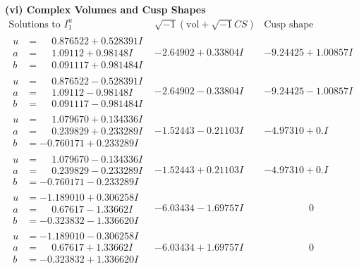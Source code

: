\documentclass[1p]{elsarticle_modified}
\theoremstyle{definition}
\newcommand{\I}{\sqrt{-1}}
\begin{document}
\newpage\flushleft \textbf{(vi) Complex Volumes and Cusp Shapes}
$$\begin{array}{c|c|c}  
\text{Solutions to }I^u_{1}& \I (\text{vol} + \sqrt{-1}CS) & \text{Cusp shape}\\
 \hline 
\begin{aligned}
u &= \phantom{-}0.876522 + 0.528391 I \\
a &= \phantom{-}1.09112 + 0.98148 I \\
b &= \phantom{-}0.091117 + 0.981484 I\end{aligned}
 & -2.64902 + 0.33804 I & -9.24425 + 1.00857 I \\ \hline\begin{aligned}
u &= \phantom{-}0.876522 - 0.528391 I \\
a &= \phantom{-}1.09112 - 0.98148 I \\
b &= \phantom{-}0.091117 - 0.981484 I\end{aligned}
 & -2.64902 - 0.33804 I & -9.24425 - 1.00857 I \\ \hline\begin{aligned}
u &= \phantom{-}1.079670 + 0.134336 I \\
a &= \phantom{-}0.239829 + 0.233289 I \\
b &= -0.760171 + 0.233289 I\end{aligned}
 & -1.52443 - 0.21103 I & -4.97310 + 0. I\phantom{ +0.000000I} \\ \hline\begin{aligned}
u &= \phantom{-}1.079670 - 0.134336 I \\
a &= \phantom{-}0.239829 - 0.233289 I \\
b &= -0.760171 - 0.233289 I\end{aligned}
 & -1.52443 + 0.21103 I & -4.97310 + 0. I\phantom{ +0.000000I} \\ \hline\begin{aligned}
u &= -1.189010 + 0.306258 I \\
a &= \phantom{-}0.67617 - 1.33662 I \\
b &= -0.323832 - 1.336620 I\end{aligned}
 & -6.03434 - 1.69757 I & \phantom{-0.000000 } 0 \\ \hline\begin{aligned}
u &= -1.189010 - 0.306258 I \\
a &= \phantom{-}0.67617 + 1.33662 I \\
b &= -0.323832 + 1.336620 I\end{aligned}
 & -6.03434 + 1.69757 I & \phantom{-0.000000 } 0 \\ \hline\begin{aligned}

\end{aligned}
\end{array}$$
\end{document}
